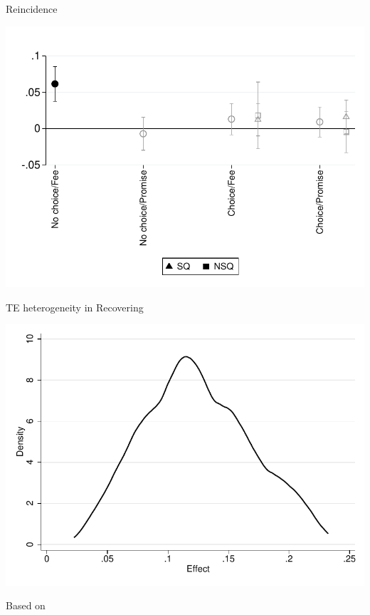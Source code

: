 \documentclass[9pt]{beamer}
\begin{document}
\begin{frame}{Reincidence}
    \begin{center}
        \includegraphics[width=.70\textwidth]{Figuras/te_graph_reincidence.pdf}
    \end{center}
\end{frame}



\begin{frame}[label = hte]{TE heterogeneity in Recovering}
    \begin{center}
        \includegraphics[width=.80\textwidth]{Figuras/he_dist_des_c_pro_2.pdf}
    \end{center}
    
 Based on \hyperlink{GRF}{}   
\end{frame}
\end{document}
